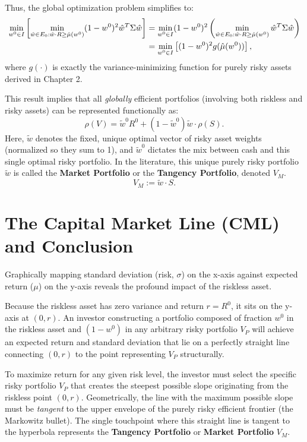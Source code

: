 Thus, the global optimization problem simplifies to:
\begin{align}
    \min_{w^0 \in I} \left[ \min_{\hat{w} \in E_0 : \hat{w} \cdot R \ge \hat{\mu}(w^0)} (1-w^0)^2 \hat{w}^T \Sigma \hat{w} \right]
    &= \min_{w^0 \in I} (1-w^0)^2 \left( \min_{\hat{w} \in E_0 : \hat{w} \cdot R \ge \hat{\mu}(w^0)} \hat{w}^T \Sigma \hat{w} \right) \notag \\
    &= \min_{w^0 \in I} \left[ (1-w^0)^2 g(\hat{\mu}(w^0)) \right],
\end{align}
where $g(\cdot)$ is exactly the variance-minimizing function for purely risky assets derived in Chapter 2.

This result implies that all \textit{globally} efficient portfolios (involving both riskless and risky assets) can be represented functionally as:
\begin{equation}
    \rho(V) = \tilde{w}^0 R^0 + (1 - \tilde{w}^0) \tilde{w} \cdot \rho(S).
\end{equation}
Here, $\tilde{w}$ denotes the fixed, unique optimal vector of risky asset weights (normalized so they sum to 1), and $\tilde{w}^0$ dictates the mix between cash and this single optimal risky portfolio. In the literature, this unique purely risky portfolio $\tilde{w}$ is called the \textbf{Market Portfolio} or the \textbf{Tangency Portfolio}, denoted $V_M$.
\begin{equation*}
    V_M := \tilde{w} \cdot S.
\end{equation*}

\section{The Capital Market Line (CML) and Conclusion}

Graphically mapping standard deviation (risk, $\sigma$) on the x-axis against expected return ($\mu$) on the y-axis reveals the profound impact of the riskless asset.

Because the riskless asset has zero variance and return $r = R^0$, it sits on the y-axis at $(0, r)$. An investor constructing a portfolio composed of fraction $w^0$ in the riskless asset and $(1-w^0)$ in any arbitrary risky portfolio $V_P$ will achieve an expected return and standard deviation that lie on a perfectly straight line connecting $(0, r)$ to the point representing $V_P$ structurally.

To maximize return for any given risk level, the investor must select the specific risky portfolio $V_P$ that creates the steepest possible slope originating from the riskless point $(0, r)$. Geometrically, the line with the maximum possible slope must be \textit{tangent} to the upper envelope of the purely risky efficient frontier (the Markowitz bullet). The single touchpoint where this straight line is tangent to the hyperbola represents the \textbf{Tangency Portfolio} or \textbf{Market Portfolio} $V_M$.

